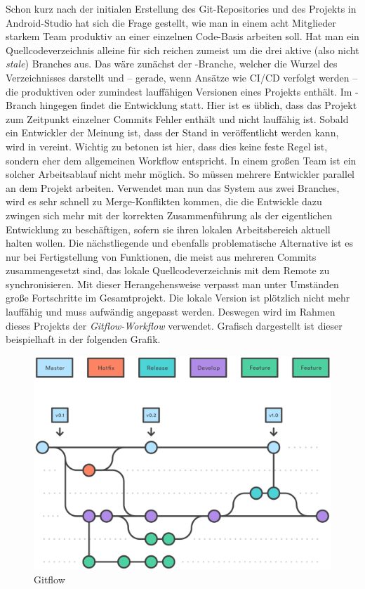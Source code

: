 Schon kurz nach der initialen Erstellung des Git-Repositories und des Projekts in Android-Studio hat sich die Frage gestellt, wie man in einem acht Mitglieder starkem Team produktiv an einer einzelnen Code-Basis arbeiten soll. Hat man ein Quellcodeverzeichnis alleine für sich reichen zumeist um die drei aktive (also nicht \textit{stale}) Branches aus. Das wäre zunächst der -Branche, welcher die Wurzel des Verzeichnisses darstellt und – gerade, wenn Ansätze wie CI/CD verfolgt werden – die produktiven oder zumindest lauffähigen Versionen eines Projekts enthält. Im -Branch hingegen findet die Entwicklung statt. Hier ist es üblich, dass das Projekt zum Zeitpunkt einzelner Commits Fehler enthält und nicht lauffähig ist. Sobald ein Entwickler der Meinung ist, dass der Stand in  veröffentlicht werden kann, wird  in  vereint. Wichtig zu betonen ist hier, dass dies keine feste Regel ist, sondern eher dem allgemeinen Workflow entspricht. In einem großen Team ist ein solcher Arbeitsablauf nicht mehr möglich. So müssen mehrere Entwickler parallel an dem Projekt arbeiten. Verwendet man nun das System aus zwei Branches, wird es sehr schnell zu Merge-Konflikten kommen, die die Entwickle dazu zwingen sich mehr mit der korrekten Zusammenführung als der eigentlichen Entwicklung zu beschäftigen, sofern sie ihren lokalen Arbeitsbereich aktuell halten wollen. Die nächstliegende und ebenfalls problematische Alternative ist es nur bei Fertigstellung von Funktionen, die meist aus mehreren Commits zusammengesetzt sind, das lokale Quellcodeverzeichnis mit dem Remote zu synchronisieren. Mit dieser Herangehensweise verpasst man unter Umständen große Fortschritte im Gesamtprojekt. Die lokale Version ist plötzlich nicht mehr lauffähig und muss aufwändig angepasst werden. Deswegen wird im Rahmen dieses Projekts der\textit{ Gitflow-Workflow} verwendet. Grafisch dargestellt ist dieser beispielhaft in der folgenden Grafik.

\begin{figure}[h]
	\includegraphics[width=\columnwidth]{img/gitflow}
	\caption[Gitflow]{Gitflow\footnotemark}
\end{figure}

